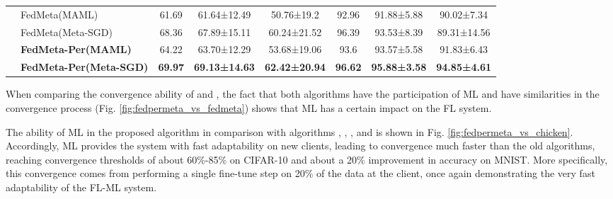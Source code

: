 \documentclass[runningheads]{llncs}
\begin{document}
\begin{table}[h]
{\begin{tabular}{c|l|ccc|ccc}
                         & FedMeta(MAML)                                                                                                      & 61.69          & 61.64±12.49          & 50.76±19.2           & 92.96                             & 91.88±5.88                        & 90.02±7.34                         \\
                         & FedMeta(Meta-SGD)                                                                                                  & 68.36          & 67.89±15.11          & 60.24±21.52          & 96.39                             & 93.53±8.39                        & 89.31±14.56                         \\
                         & \textbf{\textbf{FedMeta-Per(MAML)}}                                                                                & 64.22          & 63.70±12.29          & 53.68±19.06          & 93.6                              & 93.57±5.58                        & 91.83±6.43                         \\
                         & \textbf{\textbf{FedMeta-Per(Meta-SGD)}}                                                                            & \textbf{69.97} & \textbf{69.13±14.63} & \textbf{62.42±20.94} & \textbf{96.62}                    & \textbf{95.88±3.58}               & \textbf{94.85±4.61}                 \\
    \bottomrule
    \end{tabular}
    }
\end{table}

When comparing the convergence ability of  and , the fact that both algorithms have the participation of ML and have similarities in the convergence process (Fig. \ref{fig:fedpermeta_vs_fedmeta}) shows that ML has a certain impact on the FL system.

The ability of ML in the proposed algorithm in comparison with algorithms , , , and  is shown in Fig. \ref{fig:fedpermeta_vs_chicken}. Accordingly, ML provides the system with fast adaptability on new clients, leading to  convergence much faster than the old algorithms, reaching convergence thresholds of about 60\%-85\% on CIFAR-10 and about a 20\% improvement in accuracy on MNIST. More specifically, this convergence comes from performing a single fine-tune step on 20\% of the data at the client, once again demonstrating the very fast adaptability of the FL-ML system.
\end{document}
